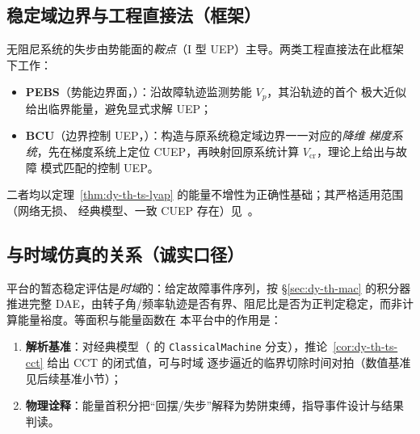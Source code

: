 \subsection{稳定域边界与工程直接法（框架）}\label{sec:dy-th-ts-bcu}
无阻尼系统的失步由势能面的\emph{鞍点}（I 型 UEP）主导。两类工程直接法在此框架下工作：
\begin{itemize}
  \item \textbf{PEBS}（势能边界面，\cite{dyts:athay}）：沿故障轨迹监测势能 $V_p$，其沿轨迹的首个
        极大近似给出临界能量，避免显式求解 UEP；
  \item \textbf{BCU}（边界控制 UEP，\cite{dyts:bcu}）：构造与原系统稳定域边界一一对应的\emph{降维
        梯度系统}，先在梯度系统上定位 CUEP，再映射回原系统计算 $V_{\mathrm{cr}}$，理论上给出与故障
        模式匹配的控制 UEP。
\end{itemize}
二者均以定理~\ref{thm:dy-th-ts-lyap} 的能量不增性为正确性基础；其严格适用范围（网络无损、
经典模型、一致 CUEP 存在）见~\cite{dyts:chiang}。

\subsection{与时域仿真的关系（诚实口径）}\label{sec:dy-th-ts-timedomain}
平台的暂态稳定评估是\emph{时域}的：给定故障事件序列，按 \S\ref{sec:dy-th-mac} 的积分器推进完整
DAE，由转子角/频率轨迹是否有界、阻尼比是否为正判定稳定，而非计算能量裕度。等面积与能量函数在
本平台中的作用是：
\begin{enumerate}
  \item \textbf{解析基准}：对经典模型（
        的 \texttt{ClassicalMachine} 分支），推论~\ref{cor:dy-th-ts-cct} 给出 CCT 的闭式值，可与时域
        逐步逼近的临界切除时间对拍（数值基准见后续基准小节）；
  \item \textbf{物理诠释}：能量首积分把“回摆/失步”解释为势阱束缚，指导事件设计与结果判读。
\end{enumerate}


